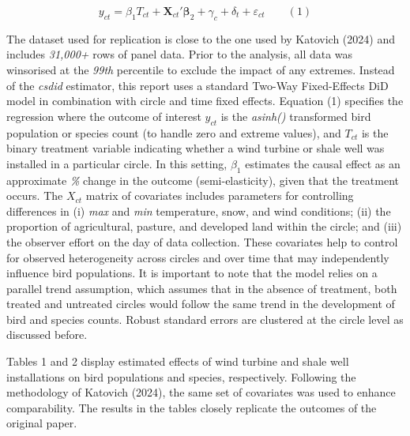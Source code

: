 \documentclass{article}
\begin{document}
\addlinespace
\[
y_{ct} = \beta_1 T_{ct} + \mathbf{X}_{ct}' \boldsymbol{\beta}_2 + \gamma_c + \delta_t + \varepsilon_{ct} \hspace{2em} (1)
\]
\addlinespace

The dataset used for replication is close to the one used by Katovich (2024) and includes \textit{31,000+} rows of panel data. Prior to the analysis, all data was winsorised at the \textit{99th} percentile to exclude the impact of any extremes. Instead of the \textit{csdid} estimator, this report uses a standard Two-Way Fixed-Effects DiD model in combination with circle and time fixed effects. Equation (1) specifies the regression where the outcome of interest \( y_{ct} \) is the \textit{asinh()} transformed bird population or species count (to handle zero and extreme values), and \( T_{ct} \) is the binary treatment variable indicating whether a wind turbine or shale well was installed in a particular circle. In this setting, \( \beta_1 \) estimates the causal effect as an approximate \textit{\%} change in the outcome (semi-elasticity), given that the treatment occurs. The \( X_{ct} \) matrix of covariates includes parameters for controlling differences in (i) \textit{max} and \textit{min} temperature, snow, and wind conditions; (ii) the proportion of agricultural, pasture, and developed land within the circle; and (iii) the observer effort on the day of data collection. These covariates help to control for observed heterogeneity across circles and over time that may independently influence bird populations. It is important to note that the model relies on a parallel trend assumption, which assumes that in the absence of treatment, both treated and untreated circles would follow the same trend in the development of bird and species counts. Robust standard errors are clustered at the circle level as discussed before.

\addlinespace

Tables 1 and 2 display estimated effects of wind turbine and shale well installations on bird populations and species, respectively. Following the methodology of Katovich (2024), the same set of covariates was used to enhance comparability. The results in the tables closely replicate the outcomes of the original paper. 
\end{document}
